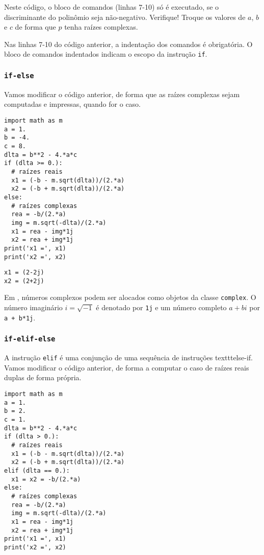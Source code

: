 Neste código, o bloco de comandos (linhas 7-10) só é executado, se o discriminante do polinômio seja não-negativo. Verifique! Troque os valores de $a$, $b$ e $c$ de forma que $p$ tenha raízes complexas.

\begin{obs}
  Nas linhas 7-10 do código anterior, a indentação dos comandos é obrigatória. O bloco de comandos indentados indicam o escopo da instrução \texttt{if}.
\end{obs}

\subsubsection{\texttt{if-else}}

Vamos modificar o código anterior, de forma que as raízes complexas sejam computadas e impressas, quando for o caso.

\begin{lstlisting}
import math as m
a = 1.
b = -4.
c = 8.
dlta = b**2 - 4.*a*c
if (dlta >= 0.):
  # raízes reais
  x1 = (-b - m.sqrt(dlta))/(2.*a)
  x2 = (-b + m.sqrt(dlta))/(2.*a)
else:
  # raízes complexas
  rea = -b/(2.*a)
  img = m.sqrt(-dlta)/(2.*a)
  x1 = rea - img*1j
  x2 = rea + img*1j
print('x1 =', x1)
print('x2 =', x2)
\end{lstlisting}

\begin{verbatim}
x1 = (2-2j)
x2 = (2+2j)
\end{verbatim}

\begin{obs}
  Em {\python}, números complexos podem ser alocados como objetos da classe \texttt{complex}. O número imaginário $i = \sqrt{-1}$ é denotado por \texttt{1j} e um número completo $a + bi$ por \texttt{a + b*1j}.
\end{obs}

\subsubsection{\texttt{if-elif-else}}

A instrução \texttt{elif} é uma conjunção de uma sequência de instruções texttt{else-if}. Vamos modificar o código anterior, de forma a computar o caso de raízes reais duplas de forma própria.

\begin{lstlisting}
import math as m
a = 1.
b = 2.
c = 1.
dlta = b**2 - 4.*a*c
if (dlta > 0.):
  # raízes reais
  x1 = (-b - m.sqrt(dlta))/(2.*a)
  x2 = (-b + m.sqrt(dlta))/(2.*a)
elif (dlta == 0.):
  x1 = x2 = -b/(2.*a)
else:
  # raízes complexas
  rea = -b/(2.*a)
  img = m.sqrt(-dlta)/(2.*a)
  x1 = rea - img*1j
  x2 = rea + img*1j
print('x1 =', x1)
print('x2 =', x2)
\end{lstlisting}

